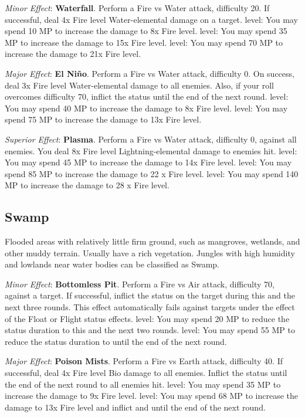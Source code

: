 \begin{multicols}{2}
\textit{Minor Effect}: \textbf{Waterfall}. Perform a Fire vs Water attack, difficulty 20. If successful, deal 4x Fire level Water-elemental damage on a target.  level: You may spend 10 MP to increase the damage to 8x Fire level.  level: You may spend 35 MP to increase the damage to 15x Fire level.  level: You may spend 70 MP to increase the damage to 21x Fire level.

\textit{Major Effect}: \textbf{El Niño}. Perform a Fire vs Water attack, difficulty 0. On success, deal 3x Fire level Water-elemental damage to all enemies. Also, if your roll overcomes difficulty 70, inflict the  status until the end of the next round.  level: You may spend 40 MP to increase the damage to 8x Fire level.  level: You may spend 75 MP to increase the damage to 13x Fire level.

\textit{Superior Effect}: \textbf{Plasma}. Perform a Fire vs Water attack, difficulty 0, against all enemies. You deal 8x Fire level Lightning-elemental damage to enemies hit.  level: You may spend 45 MP to increase the damage to 14x Fire level.  level: You may spend 85 MP to increase the damage to 22 x Fire level.  level: You may spend 140 MP to increase the damage to 28 x Fire level.

\subsection*{Swamp}\label{subsec:geo-swamp}
Flooded areas with relatively little firm ground, such as mangroves, wetlands, and other muddy terrain. Usually have a rich vegetation. Jungles with high humidity and lowlands near water bodies can be classified as Swamp.

\textit{Minor Effect}: \textbf{Bottomless Pit}. Perform a Fire vs Air attack, difficulty 70, against a target. If successful, inflict the  status on the target during this and the next three rounds. This effect automatically fails against targets under the effect of the Float or Flight status effects.  level: You may spend 20 MP to reduce the status duration to this and the next two rounds.  level: You may spend 55 MP to reduce the status duration to until the end of the next round.

\textit{Major Effect}: \textbf{Poison Mists}. Perform a Fire vs Earth attack, difficulty 40. If successful, deal 4x Fire level Bio damage to all enemies. Inflict the  status until the end of the next round to all enemies hit.  level: You may spend 35 MP to increase the damage to 9x Fire level.  level: You may spend 68 MP to increase the damage to 13x Fire level and inflict  and  until the end of the next round.


\end{multicols}
